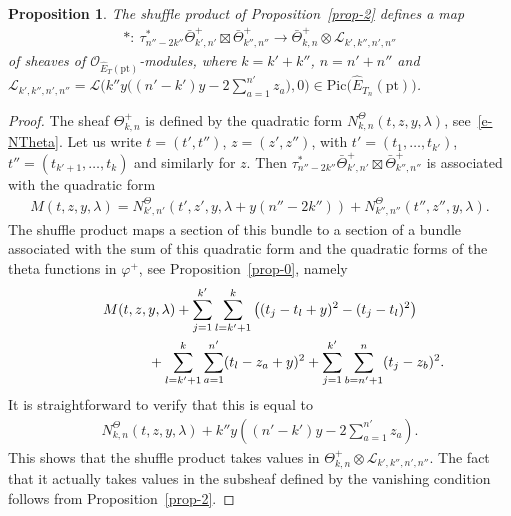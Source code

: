 \documentclass[pdftex]{sigma}
\numberwithin{equation}{section}
\newtheorem{Proposition}[Theorem]{Proposition}
 { \theoremstyle{definition}
\newtheorem{Definition}[Theorem]{Definition}
\newtheorem{Example}[Theorem]{Example}
\newtheorem{Remark}[Theorem]{Remark} }
\begin{document}
\begin{Proposition} The shuffle product of Proposition~{\rm \ref{prop-2}} defines a map
\begin{gather*}
*\colon \ \tau^*_{n''-2k''}\bar\Theta^+_{k',n'}\boxtimes\bar\Theta^+_{k'',n''}\to\bar\Theta^+_{k,n}\otimes \mathcal L_{k',k'',n',n''}
\end{gather*}
of sheaves of $\mathcal O_{\hat E_T(\mathrm{pt})}$-modules, where $k=k'+k''$, $n=n'+n''$ and $\mathcal L_{k',k'',n',n''}= \mathcal L\Big(k''y\Big((n'-k')y-2\sum\limits_{a=1}^{n'}z_a\Big),0\Big)\in\mathrm{Pic}\big(\hat E_{T_n}(\mathrm{pt})\big)$.
\end{Proposition}
\begin{proof} The sheaf $\Theta^+_{k,n}$ is defined by the quadratic form $N^\Theta_{k,n}(t,z,y,\lambda)$, see~\eqref{e-NTheta}. Let us write $t=(t',t'')$, $z=(z',z'')$, with $t'=(t_1,\dots,t_{k'})$, $t''=(t_{k'+1},\dots,t_k)$ and similarly for $z$. Then $\tau^*_{n''-2k''}\bar\Theta^+_{k',n'}\boxtimes\bar\Theta^+_{k'',n''}$ is associated with the quadratic form
 \begin{gather*}
 M(t,z,y,\lambda)=N^\Theta_{k',n'}(t',z',y,\lambda+y(n''-2k'')) +N^\Theta_{k'',n''}(t'',z'',y,\lambda).
 \end{gather*}
 The shuffle product maps a section of this bundle to a section of a bundle associated with the sum of this quadratic form and the quadratic forms of the theta functions in $\varphi^+$, see Proposition~\ref{prop-0}, namely
 \begin{gather*}
 M(t,z,y,\lambda) + \sum_{j=1}^{k'}\sum_{l=k'+1}^k \big((t_j-t_l+y)^2-(t_j-t_l)^2\big)\\
\hphantom{M(t,z,y,\lambda)}{} +\sum_{l=k'+1}^k \sum_{a=1}^{n'}(t_l-z_a+y)^2+\sum_{j=1}^{k'}\sum_{b=n'+1}^n (t_j-z_b)^2.
 \end{gather*}
 It is straightforward to verify that this is equal to
 \begin{gather*}
 N^\Theta_{k,n}(t,z,y,\lambda)+k''y\left((n'-k')y-2\sum_{a=1}^{n'}z_a\right).
 \end{gather*}
 This shows that the shuffle product takes values in $\Theta^+_{k,n}\otimes\mathcal L_{k',k'',n',n''}$. The fact that it actually takes values in the subsheaf defined by the vanishing condition follows from Proposition~\ref{prop-2}.
\end{proof}
\end{document}
